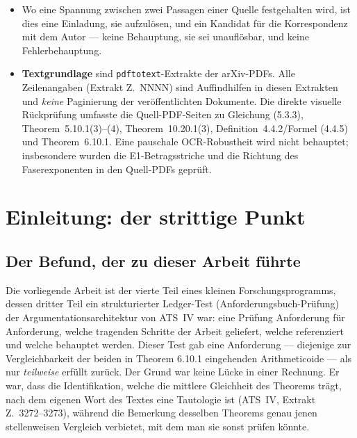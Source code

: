\documentclass[11pt,a4paper]{article}
\theoremstyle{definition}
\theoremstyle{plain}
\theoremstyle{definition}
\newcommand{\anchor}[2]{(#1, Extrakt Z.~#2)}
\begin{document}
\begin{center}
{{\begin{itemize}
\item Wo eine Spannung zwischen zwei Passagen einer Quelle festgehalten wird, ist
  dies eine Einladung, sie aufzulösen, und ein Kandidat für die Korrespondenz mit
  dem Autor --- keine Behauptung, sie sei unauflösbar, und keine
  Fehlerbehauptung.
\item \textbf{Textgrundlage} sind \texttt{pdftotext}-Extrakte der arXiv-PDFs.
  Alle Zeilenangaben (\glqq Extrakt Z.~NNNN\grqq) sind Auffindhilfen in diesen
  Extrakten und \emph{keine} Paginierung der veröffentlichten Dokumente. Die
  direkte visuelle Rückprüfung umfasste die Quell-PDF-Seiten zu Gleichung (5.3.3),
  Theorem~5.10.1(3)--(4), Theorem~10.20.1(3),
  Definition~4.4.2/Formel (4.4.5) und Theorem~6.10.1. Eine pauschale
  OCR-Robustheit wird nicht behauptet; insbesondere wurden die E1-Betragsstriche
  und die Richtung des Faserexponenten in den Quell-PDFs geprüft.
\end{itemize}
\medskip
}}
\end{center}

\clearpage
\tableofcontents
\clearpage

\section{Einleitung: der strittige Punkt}

\subsection{Der Befund, der zu dieser Arbeit führte}

Die vorliegende Arbeit ist der vierte Teil eines kleinen Forschungsprogramms,
dessen dritter Teil ein strukturierter \glqq Ledger-Test\grqq{}
(Anforderungsbuch-Prüfung) der Argumentationsarchitektur von ATS~IV war: eine
Prüfung Anforderung für Anforderung, welche tragenden Schritte der Arbeit
geliefert, welche referenziert und welche behauptet werden. Dieser Test gab eine
Anforderung --- diejenige zur Vergleichbarkeit der beiden in Theorem 6.10.1
eingehenden Arithmeticoide --- als nur \emph{teilweise} erfüllt zurück. Der Grund
war keine Lücke in einer Rechnung. Er war, dass die Identifikation, welche die
mittlere Gleichheit des Theorems trägt, nach dem eigenen Wort des Textes eine
Tautologie ist \anchor{ATS~IV}{3272--3273}, während die Bemerkung desselben
Theorems genau jenen stellenweisen Vergleich verbietet, mit dem man sie sonst
prüfen könnte.
\end{document}
